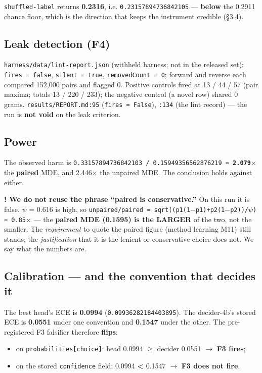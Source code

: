 \documentclass[11pt,a4paper]{article}
\begin{document}
\texttt{shuffled-label} returns \textbf{0.2316}, i.e. \texttt{0.23157894736842105} --- \textbf{below} the 0.2911 chance floor, which is the direction that keeps the instrument credible (\S3.4).

\subsection{Leak detection (F4)}

\texttt{harness/data/lint-report.json} (withheld harness; not in the released set): \texttt{fires = false}, \texttt{silent = true}, \texttt{removedCount = 0}; forward and reverse each compared 152,000 pairs and flagged 0. Positive controls fired at 13 / 44 / 57 (pair maxima; totals 13 / 220 / 233); the negative control (a novel row) shared 0 grams. \texttt{results/REPORT.md:95} (\texttt{fires = False}), \texttt{:134} (the lint record) --- the run is \textbf{not void} on the leak criterion.

\subsection{Power}

The observed harm is \texttt{0.33157894736842103 / 0.15949356562876219 = \textbf{2.079$\times$}} the \textbf{paired} MDE, and 2.446$\times$ the unpaired MDE. The conclusion holds against either.

\textbf{! We do not reuse the phrase ``paired is conservative.''} On this run it is false. $\psi$ = 0.616 is high, so \texttt{unpaired/paired = sqrt((p1(1$-$p1)+p2(1$-$p2))/$\psi$) = 0.85$\times$} --- the \textbf{paired MDE (0.1595) is the LARGER} of the two, not the smaller. The \emph{requirement} to quote the paired figure (method learning M11) still stands; the \emph{justification} that it is the lenient or conservative choice does not. We say what the numbers are.

\subsection{Calibration --- and the convention that decides it}

The best head's ECE is \textbf{0.0994} (\texttt{0.09936282184403895}). The decider-4b's stored ECE is \textbf{0.0551} under one convention and \textbf{0.1547} under the other. The pre-registered F3 falsifier therefore \textbf{flips}:

\begin{itemize}
\item on \texttt{probabilities[choice]}: head 0.0994 \textbf{$\ge$} decider 0.0551 $\to$ \textbf{F3 fires};
\item on the stored \texttt{confidence} field: 0.0994 \textbf{<} 0.1547 $\to$ \textbf{F3 does not fire}.
\end{itemize}
\end{document}
